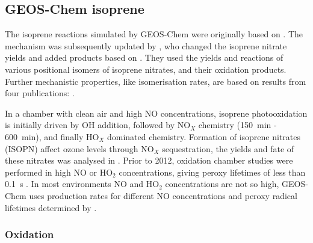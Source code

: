   \subsection{GEOS-Chem isoprene}
    \label{Model:GC:Isop}
    
    The isoprene reactions simulated by GEOS-Chem were originally based on \textcite{Horowitz1998}.
    The mechanism was subsequently updated by \textcite{Mao2013}, who changed the isoprene nitrate yields and added products based on \textcite{Paulot2009a, Paulot2009b}.
    They used the yields and reactions of various positional isomers of isoprene nitrates, and their oxidation products. %
    Further mechanistic properties, like isomerisation rates, are based on results from four publications: \textcite{Peeters2009, Peeters2010, Crounse2011, Crounse2012}.    
    
    In a chamber with clean air and high NO concentrations, isoprene photooxidation is initially driven by OH addition, followed by NO$_X$ chemistry (150~min - 600~min), and finally HO$_X$ dominated chemistry.
    Formation of isoprene nitrates (ISOPN) affect ozone levels through NO$_X$ sequestration, the yields and fate of these nitrates was analysed in \textcite{Paulot2009a}.
    Prior to 2012, oxidation chamber studies were performed in high NO or HO$_2$ concentrations, giving peroxy lifetimes of less than 0.1~s \parencite{Crounse2012, Wolfe2012}.
    In most environments NO and HO$_2$ concentrations are not so high, GEOS-Chem uses production rates for different NO concentrations and peroxy radical lifetimes determined by \textcite{Crounse2012}.
    
    \subsubsection{Oxidation}
    
